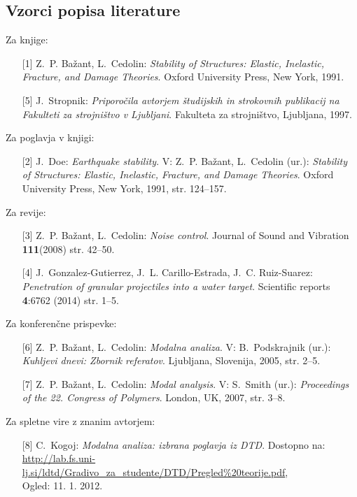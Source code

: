 \subsection{Vzorci popisa literature}\label{sec:vzorci_lit}

Za knjige:
\begin{itemize}
\item[{[1]}] Z.~P. Ba\v{z}ant, L.~Cedolin: \emph{Stability of Structures: Elastic,
  Inelastic, Fracture, and Damage Theories}. Oxford University Press, New York,
  1991.
\item[{[5]}] J.~Stropnik: \emph{Priporočila avtorjem študijskih in strokovnih publikacij
  na Fakulteti za strojništvo v Ljubljani}. Fakulteta za strojništvo,
  Ljubljana, 1997.
\end{itemize}

Za poglavja v knjigi:
\begin{itemize}
\item[{[2]}] J.~Doe: \emph{Earthquake stability}. V: Z.~P. Ba\v{z}ant, L.~Cedolin (ur.):
  \emph{Stability of Structures: Elastic, Inelastic, Fracture, and Damage
  Theories}. Oxford University Press, New York, 1991, str. 124--157.
\end{itemize}

Za revije:
\begin{itemize}
\item[{[3]}] Z.~P. Ba\v{z}ant, L.~Cedolin: \emph{Noise control}. Journal of Sound and
  Vibration \textbf{111}(2008) str. 42--50.
\item[{[4]}] J.~Gonzalez-Gutierrez, J.~L. Carillo-Estrada, J.~C. Ruiz-Suarez:
  \emph{Penetration of granular projectiles into a water target}. Scientific
  reports \textbf{4}:6762 (2014) str. 1--5.
\end{itemize}

Za konferenčne prispevke:
\begin{itemize}
\item[{[6]}] Z.~P. Ba\v{z}ant, L.~Cedolin: \emph{Modalna analiza}. V: B.~Podskrajnik (ur.):
  \emph{Kuhljevi dnevi: Zbornik referatov}. Ljubljana, Slovenija, 2005, str.
  2--5.
\item[{[7]}] Z.~P. Ba\v{z}ant, L.~Cedolin: \emph{Modal analysis}. V: S.~Smith (ur.):
  \emph{Proceedings of the 22. Congress of Polymers}. London, UK, 2007, str.
  3--8.
\end{itemize}

Za spletne vire z znanim avtorjem:
\begin{itemize}
\item[{[8]}] C.~Kogoj: \emph{Modalna analiza: izbrana poglavja iz {DTD}}. Dostopno na:
  \url{http://lab.fs.uni-lj.si/ldtd/Gradivo_za_studente/DTD/Pregled\%20teorije.pdf},\\
  Ogled: 11. 1. 2012.
\end{itemize}

